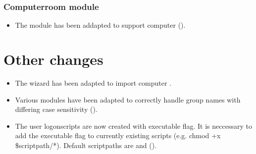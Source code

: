 
\subsubsection{Computerroom module}
\begin{itemize}
\item The  module has been addapted to support  computer ().
\end{itemize}



\section{Other changes}
\begin{itemize}
\item The  wizard has been adapted to import  computer .
\item Various  modules have been adapted to correctly handle group names with differing case sensitivity ().
\item The user logonscripts are now created with executable flag.
 It is neccessary to add the executable flag to currently existing scripts (e.g. chmod +x \$scriptpath/*).
 Default scriptpaths are  and  ().
\end{itemize}
